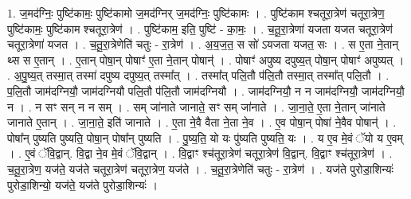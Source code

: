 \documentclass[17pt]{extarticle}
\begin{document}
1. ज॒मद॑ग्निः॒ पुष्टि॑कामः॒ पुष्टि॑कामो ज॒मद॑ग्निर् ज॒मद॑ग्निः॒ पुष्टि॑कामः । . पुष्टि॑काम श्चतूरा॒त्रेण॑ चतूरा॒त्रेण॒ पुष्टि॑कामः॒ पुष्टि॑काम श्चतूरा॒त्रेण॑ । . पुष्टि॑काम॒ इति॒ पुष्टि॑ - का॒मः॒ । . च॒तू॒रा॒त्रेणा॑ यजता यजत चतूरा॒त्रेण॑ चतूरा॒त्रेणा॑ यजत । . च॒तू॒रा॒त्रेणेति॑ चतुः - रा॒त्रेण॑ । . अ॒य॒ज॒त॒ स सो॑ ऽयजता यजत॒ सः । . स ए॒ता ने॒तान् थ्स स ए॒तान् । . ए॒तान् पोषा॒न् पोषाꣳ॑ ए॒ता ने॒तान् पोषान्॑ । . पोषाꣳ॑ अपुष्य दपुष्य॒त् पोषा॒न् पोषाꣳ॑ अपुष्यत् । . अ॒पु॒ष्य॒त् तस्मा॒त् तस्मा॑ दपुष्य दपुष्य॒त् तस्मा᳚त् । . तस्मा᳚त् पलि॒तौ प॑लि॒तौ तस्मा॒त् तस्मा᳚त् पलि॒तौ । . प॒लि॒तौ जाम॑दग्नियौ॒ जाम॑दग्नियौ पलि॒तौ प॑लि॒तौ जाम॑दग्नियौ । . जाम॑दग्नियौ॒ न न जाम॑दग्नियौ॒ जाम॑दग्नियौ॒ न । . न सꣳ सन् न न सम् । . सम् जा॑नाते जानाते॒ सꣳ सम् जा॑नाते । . जा॒ना॒ते॒ ए॒ता ने॒तान् जा॑नाते जानाते ए॒तान् । . जा॒ना॒ते॒ इति॑ जानाते । . ए॒ता ने॒वै वैता ने॒ता ने॒व । . ए॒व पोषा॒न् पोषा॑ ने॒वैव पोषान्॑ । . पोषा᳚न् पुष्यति पुष्यति॒ पोषा॒न् पोषा᳚न् पुष्यति । . पु॒ष्य॒ति॒ यो यः पु॑ष्यति पुष्यति॒ यः । . य ए॒व मे॒वं ॅयो य ए॒वम् । . ए॒वं ॅवि॒द्वान्. वि॒द्वा ने॒व मे॒वं ॅवि॒द्वान् । . वि॒द्वाꣳ श्च॑तूरा॒त्रेण॑ चतूरा॒त्रेण॑ वि॒द्वान्. वि॒द्वाꣳ श्च॑तूरा॒त्रेण॑ । . च॒तू॒रा॒त्रेण॒ यज॑ते॒ यज॑ते चतूरा॒त्रेण॑ चतूरा॒त्रेण॒ यज॑ते । . च॒तू॒रा॒त्रेणेति॑ चतुः - रा॒त्रेण॑ । . यज॑ते पुरोडा॒शिन्यः॑ पुरोडा॒शिन्यो॒ यज॑ते॒ यज॑ते पुरोडा॒शिन्यः॑ । \newline
\end{document}
